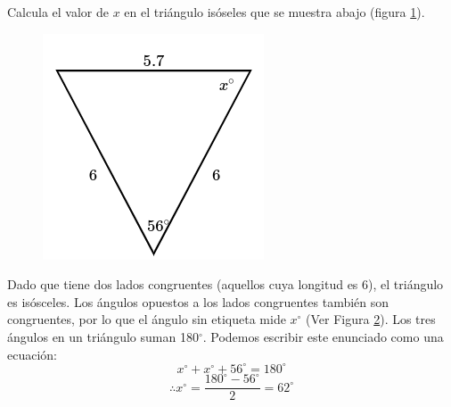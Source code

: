 Calcula el valor de $x$ en el triángulo isóseles  que se muestra abajo (figura \ref{fig:findangle09}).

\begin{minipage}[t][][t]{0.35\textwidth}
    \begin{figure}[H]
        \begin{center}
            \includegraphics[width=0.9\linewidth]{../images/findangle09.png}
        \end{center}
        \caption{}
        \label{fig:findangle09}
    \end{figure}
\end{minipage}\hfill
\begin{minipage}[t][][t]{0.6\textwidth}
    \begin{solutionbox}{8cm}
        \begin{minipage}{0.3\textwidth}
            \begin{figure}[H]
                \centering
                \caption{}
                \label{fig:findangle09a}
            \end{figure}
        \end{minipage}\hfill
        \begin{minipage}{0.65\textwidth}
            Dado que tiene dos lados congruentes (aquellos cuya longitud es 6), el triángulo es isósceles. Los ángulos opuestos a los lados congruentes también son congruentes, por lo que el ángulo sin etiqueta mide $x^\circ$ (Ver Figura \ref{fig:findangle09a}).
            Los tres ángulos en un triángulo suman 180$^\circ$. Podemos escribir este enunciado como una ecuación:
            \[x^\circ + x^\circ + 56^\circ = 180^\circ \]
            \[\therefore x^\circ = \dfrac{180^\circ - 56^\circ}{2}  = 62^\circ\]
        \end{minipage}
    \end{solutionbox}
\end{minipage}